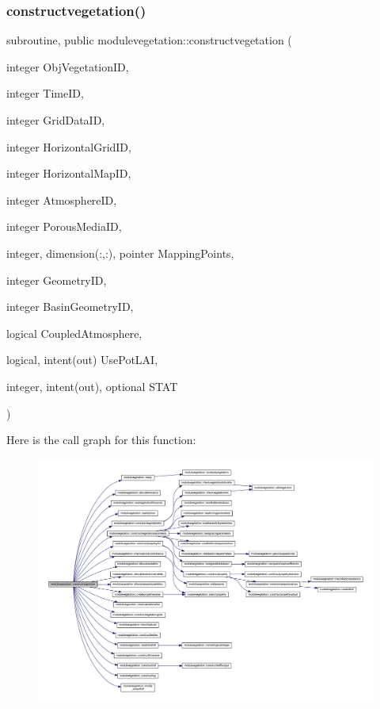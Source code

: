 \subsubsection{\texorpdfstring{constructvegetation()}{constructvegetation()}}
{\footnotesize\ttfamily subroutine, public modulevegetation\+::constructvegetation (\begin{DoxyParamCaption}\item[{integer}]{Obj\+Vegetation\+ID,  }\item[{integer}]{Time\+ID,  }\item[{integer}]{Grid\+Data\+ID,  }\item[{integer}]{Horizontal\+Grid\+ID,  }\item[{integer}]{Horizontal\+Map\+ID,  }\item[{integer}]{Atmosphere\+ID,  }\item[{integer}]{Porous\+Media\+ID,  }\item[{integer, dimension(\+:,\+:), pointer}]{Mapping\+Points,  }\item[{integer}]{Geometry\+ID,  }\item[{integer}]{Basin\+Geometry\+ID,  }\item[{logical}]{Coupled\+Atmosphere,  }\item[{logical, intent(out)}]{Use\+Pot\+L\+AI,  }\item[{integer, intent(out), optional}]{S\+T\+AT }\end{DoxyParamCaption})}

Here is the call graph for this function\+:\nopagebreak
\begin{figure}[H]
\begin{center}
\leavevmode
\includegraphics[width=350pt]{namespacemodulevegetation_ad61df3e43415a3c06f75588d06f77cce_cgraph}
\end{center}
\end{figure}
\mbox{\label{namespacemodulevegetation_a244fa0ac53269288775789c370d4ef6e}} 
